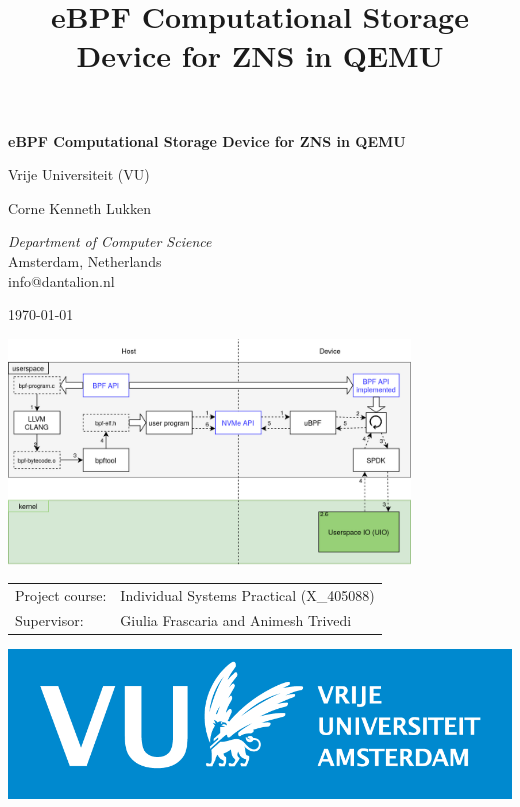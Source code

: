 \documentclass[conference]{IEEEtran}
\title{eBPF Computational Storage Device for ZNS in QEMU%
}
\begin{document}
\begin{titlepage}
\begingroup
\centering
{\LARGE\bfseries eBPF Computational Storage Device for ZNS in QEMU}

\vspace{1cm}

{\Large Vrije Universiteit (VU)}

\vspace{0.5cm}

{Corne Kenneth Lukken}

{\textit{Department of Computer Science} \\
Amsterdam, Netherlands \\
info@dantalion.nl}

\vspace{0.5cm}

\today

\vspace{4.0cm}

\includegraphics[width=0.8\textwidth]{resources/images/prototype-landscape.png}

\vfill
\endgroup
\begin{minipage}{0.4\textwidth}
	\begin{tabular}{ll}
		\Large Project course: & \Large Individual Systems Practical (X\_405088) \\
		\Large Supervisor: & \Large Giulia Frascaria and Animesh Trivedi \\
	\end{tabular}
\end{minipage} \hfill
\begin{minipage}{0.3\textwidth}
	\begin{flushright}
	\includegraphics[width=\textwidth]{resources/images/vu-logo.png}
\end{flushright}
\end{minipage}
\end{titlepage}
\end{document}
